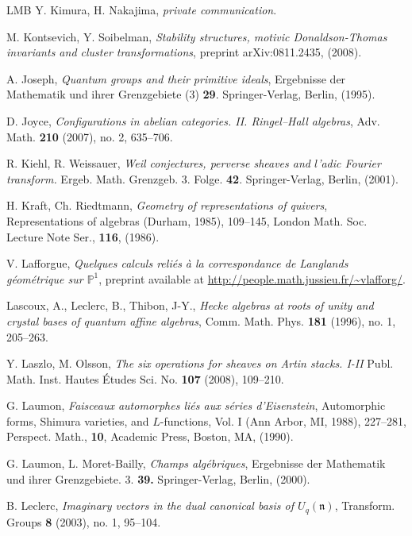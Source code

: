 \documentclass[a4paper,10pt]{amsart}
\numberwithin{equation}{section}
\begin{document}
{\begin{thebibliography}{LMB}
Y. Kimura, H. Nakajima, \textit{private communication}.

M. Kontsevich, Y. Soibelman, \emph{Stability structures, motivic Donaldson-Thomas invariants and cluster transformations}, preprint arXiv:0811.2435, (2008).

A. Joseph, \emph{Quantum groups and their primitive ideals}, Ergebnisse der Mathematik und ihrer Grenzgebiete (3) \textbf{29}. Springer-Verlag, Berlin, (1995).

D. Joyce, \emph{Configurations in abelian categories. II. Ringel--Hall algebras}, Adv. Math. \textbf{210} (2007), no. 2, 635--706.

R. Kiehl, R. Weissauer, \emph{Weil conjectures, perverse sheaves and $l$'adic Fourier transform.} Ergeb. Math. Grenzgeb. 3. Folge. \textbf{42}. Springer-Verlag, Berlin, (2001).

H. Kraft, Ch. Riedtmann, \emph{Geometry of representations of quivers},  Representations of algebras (Durham, 1985),  109--145, London Math. Soc. Lecture Note Ser., \textbf{116}, (1986).

  V. Lafforgue, \emph{Quelques calculs reli\'es \`a la correspondance de Langlands g\'eom\'etrique sur $\mathbb{P}^1$}, preprint available at \url{http://people.math.jussieu.fr/~vlafforg/}.

Lascoux, A., Leclerc, B., Thibon, J-Y., \emph{Hecke algebras at roots of unity and crystal bases of quantum affine algebras}, Comm. Math. Phys. \textbf{181}  (1996),  no. 1, 205--263. 

Y. Laszlo, M. Olsson, \emph{The six operations for sheaves on Artin stacks. I-II}  Publ. Math. Inst. Hautes Études Sci.  No. \textbf{107}  (2008), 109--210.

G. Laumon, \emph{Faisceaux automorphes li\'es aux s\'eries d'Eisenstein}, Automorphic forms, Shimura varieties, and $L$-functions, Vol. I (Ann Arbor, MI, 1988), 227--281, Perspect. Math., \textbf{10}, Academic Press, Boston, MA, (1990).

G. Laumon, L. Moret-Bailly, \emph{Champs alg\'ebriques}, Ergebnisse der Mathematik und ihrer Grenzgebiete. 3. \textbf{39.} Springer-Verlag, Berlin, (2000).

B. Leclerc, \emph{Imaginary vectors in the dual canonical basis of $U_q(\mathfrak{n})$},  Transform. Groups  \textbf{8}  (2003),  no. 1, 95--104. 


\end{thebibliography}}
\end{document}
